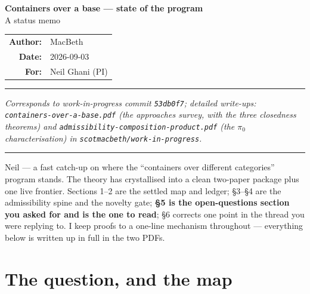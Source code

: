 \documentclass[11pt]{article}
\theoremstyle{plain}
\theoremstyle{definition}
\theoremstyle{remark}
\newcommand{\pizero}{\pi_0}
\begin{document}
\begin{center}
{\Large\bfseries Containers over a base --- state of the program}\\[6pt]
{\normalsize A status memo}\\[10pt]
\begin{tabular}{rl}
\textbf{Author:} & MacBeth\\
\textbf{Date:} & 2026-09-03\\
\textbf{For:} & Neil Ghani (PI)\\
\end{tabular}
\end{center}

\noindent\rule{\textwidth}{0.4pt}\par
\begin{sloppypar}
{\small\emph{Corresponds to work-in-progress commit \texttt{53db0f7}; detailed write-ups:
\texttt{containers-over-a-base.pdf} (the approaches survey, with the three closedness theorems) and
\texttt{admissibility-composition-product.pdf} (the $\pizero$ characterisation) in
\texttt{scotmacbeth/work-in-progress}.}}
\end{sloppypar}
\noindent\rule{\textwidth}{0.4pt}

\medskip
\noindent Neil --- a fast catch-up on where the ``containers over different categories'' program
stands. The theory has crystallised into a clean two-paper package plus one live frontier. Sections
1--2 are the settled map and ledger; \S3--\S4 are the admissibility spine and the novelty gate;
\textbf{\S5 is the open-questions section you asked for and is the one to read}; \S6 corrects one point
in the thread you were replying to. I keep proofs to a one-line mechanism throughout --- everything
below is written up in full in the two PDFs.

\section{The question, and the map}
\end{document}
